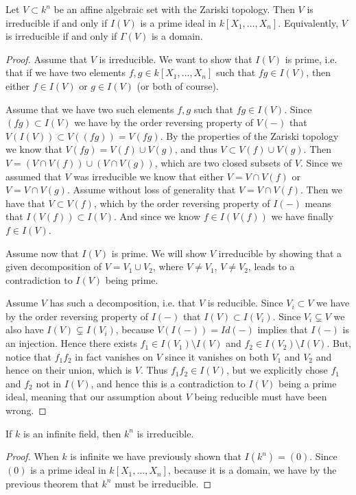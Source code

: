 \begin{theorem}
Let $V\subset k^n$ be an affine algebraic set with the Zariski topology. Then $V$ is irreducible if and only if $I(V)$ is a prime ideal in $k[X_1, \ldots, X_n]$. Equivalently, $V$ is irreducible if and only if $\Gamma(V)$ is a domain. 
\end{theorem}
\label{thm:irreducible_iff_prime}
\begin{proof}
Assume that $V$ is irreducible. We want to show that $I(V)$ is prime, i.e. that if we have two elements $f, g\in k[X_1, \ldots, X_n]$ such that $fg\in I(V)$, then either $f\in I(V)$ or $g\in I(V)$ (or both of course). 

Assume that we have two such elements $f, g$ such that $fg\in I(V)$. Since $(fg) \subset I(V)$ we have by the order reversing property of $V(-)$ that $V(I(V)) \subset V((fg)) = V(fg)$. By the properties of the Zariski topology we know that $V(fg) = V(f)\cup V(g)$, and thus $V\subset V(f)\cup V(g)$. Then $V=(V\cap V(f))\cup (V\cap V(g))$, which are two closed subsets of $V$. Since we assumed that $V$ was irreducible we know that either $V=V\cap V(f)$ or $V=V\cap V(g)$. Assume without loss of generality that $V=V\cap V(f)$. Then we have that $V\subset V(f)$, which by the order reversing property of $I(-)$ means that $I(V(f))\subset I(V)$. And since we know $f\in I(V(f))$ we have finally $f\in I(V)$.

Assume now that $I(V)$ is prime. We will show $V$ irreducible by showing that a given decomposition of $V=V_1\cup V_2$, where $V\neq V_1$, $V\neq V_2$, leads to a contradiction to $I(V)$ being prime. 

Assume $V$ has such a decomposition, i.e. that $V$ is reducible. Since $V_i\subset V$ we have by the order reversing property of $I(-)$ that $I(V)\subset I(V_i)$. Since $V_i\subsetneq V$ we also have $I(V)\subsetneq I(V_i)$, because $V(I(-)) = Id(-)$ implies that $I(-)$ is an injection. Hence there exists $f_1 \in I(V_1) \setminus I(V)$ and $f_2\in I(V_2)\setminus I(V)$. But, notice that $f_1 f_2$ in fact vanishes on $V$ since it vanishes on both $V_1$ and $V_2$ and hence on their union, which is $V$. Thus $f_1 f_2 \in I(V)$, but we explicitly chose $f_1$ and $f_2$ not in $I(V)$, and hence this is a contradiction to $I(V)$ being a prime ideal, meaning that our assumption about $V$ being reducible must have been wrong. 
\end{proof}

\begin{corollary}
If $k$ is an infinite field, then $k^n$ is irreducible. 
\end{corollary}
\begin{proof}
When $k$ is infinite we have previously shown that $I(k^n)=(0)$. Since $(0)$ is a prime ideal in $k[X_1, \ldots, X_n]$, because it is a domain, we have by the previous theorem that $k^n$ must be irreducible. 
\end{proof}

